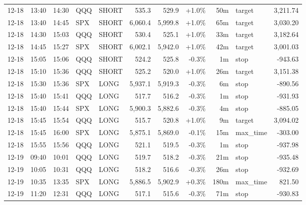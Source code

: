 \documentclass[11pt,a4paper,twoside]{article}
\begin{document}
\begin{center}
\begin{longtable}{>{\color{txtmain}}l l l l l r r r r >{\color{txtmain}}l r}
12-18 & 13:40 & 14:30 & QQQ & SHORT & 535.3 & 529.9 & \textcolor{wingreen}{+1.0\%} & 50m & target & \textcolor{wingreen}{3,211.74} \\
12-18 & 13:40 & 14:45 & SPX & SHORT & 6,060.4 & 5,999.8 & \textcolor{wingreen}{+1.0\%} & 65m & target & \textcolor{wingreen}{3,030.20} \\
12-18 & 14:30 & 15:03 & QQQ & SHORT & 530.4 & 525.1 & \textcolor{wingreen}{+1.0\%} & 33m & target & \textcolor{wingreen}{3,182.64} \\
12-18 & 14:45 & 15:27 & SPX & SHORT & 6,002.1 & 5,942.0 & \textcolor{wingreen}{+1.0\%} & 42m & target & \textcolor{wingreen}{3,001.03} \\
12-18 & 15:05 & 15:06 & QQQ & SHORT & 524.2 & 525.8 & \textcolor{lossred}{-0.3\%} & 1m & stop & \textcolor{lossred}{-943.63} \\
12-18 & 15:10 & 15:36 & QQQ & SHORT & 525.2 & 520.0 & \textcolor{wingreen}{+1.0\%} & 26m & target & \textcolor{wingreen}{3,151.38} \\
12-18 & 15:30 & 15:36 & SPX & LONG & 5,937.1 & 5,919.3 & \textcolor{lossred}{-0.3\%} & 6m & stop & \textcolor{lossred}{-890.56} \\
12-18 & 15:40 & 15:41 & QQQ & LONG & 517.7 & 516.2 & \textcolor{lossred}{-0.3\%} & 1m & stop & \textcolor{lossred}{-931.93} \\
12-18 & 15:40 & 15:44 & SPX & LONG & 5,900.3 & 5,882.6 & \textcolor{lossred}{-0.3\%} & 4m & stop & \textcolor{lossred}{-885.05} \\
12-18 & 15:45 & 15:54 & QQQ & LONG & 515.7 & 520.8 & \textcolor{wingreen}{+1.0\%} & 9m & target & \textcolor{wingreen}{3,094.02} \\
12-18 & 15:45 & 16:00 & SPX & LONG & 5,875.1 & 5,869.0 & \textcolor{lossred}{-0.1\%} & 15m & max\_time & \textcolor{lossred}{-303.00} \\
12-18 & 15:55 & 15:56 & QQQ & LONG & 521.1 & 519.5 & \textcolor{lossred}{-0.3\%} & 1m & stop & \textcolor{lossred}{-937.98} \\
12-19 & 09:40 & 10:01 & QQQ & LONG & 519.7 & 518.2 & \textcolor{lossred}{-0.3\%} & 21m & stop & \textcolor{lossred}{-935.48} \\
12-19 & 10:05 & 10:31 & QQQ & LONG & 518.2 & 516.6 & \textcolor{lossred}{-0.3\%} & 26m & stop & \textcolor{lossred}{-932.69} \\
12-19 & 10:35 & 13:35 & SPX & LONG & 5,886.5 & 5,902.9 & \textcolor{wingreen}{+0.3\%} & 180m & max\_time & \textcolor{wingreen}{821.50} \\
12-19 & 11:20 & 12:31 & QQQ & LONG & 517.1 & 515.6 & \textcolor{lossred}{-0.3\%} & 71m & stop & \textcolor{lossred}{-930.83} \\

\end{longtable}
\end{center}
\end{document}
